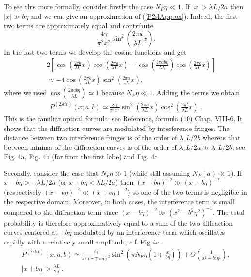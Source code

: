 \documentclass[12pt]{article}   %
\begin{document}
To see this more formally, consider firstly the case
$N_F\eta\ll1$. If $|x|>\lambda L/2a$ then $|x|\gg b\eta$ and we
can give an approximation of (\ref{P2slApprox}). Indeed, the first
two terms are approximately equal and contribute $$
\frac{4\gamma}{\pi^2 x^2} \sin^2 ( \frac{2 \pi a}{\lambda L} x).
$$  In the last two terms we develop the cosine functions and get
\begin{eqnarray*}
&& 2 \left[\cos{(\frac{2\pi b}{\lambda L}x)}\cos{(\frac{2\pi
a}{\lambda L}x)}-\cos{(\frac{2\pi ab\eta}{\lambda
L})}\cos{(\frac{2\pi b}{\lambda L}x)} \right] \\ && \approx -4
\cos (\frac{2 \pi b}{\lambda L} x) \sin^2 (\frac{2 \pi a}{\lambda
L} x),
\end{eqnarray*}
where we used $\cos{(\frac{2\pi ab\eta}{\lambda L})}\simeq1$
because $N_F\eta\ll1$. Adding the terms we obtain
\begin{eqnarray}\label{P2slApprox2}
P^{(2slit)}(x;a,b) \simeq \frac{8\gamma}{\pi^2
x^2}\sin^2{(\frac{2\pi a}{\lambda L}x)} \cos^2{(\frac{2\pi
b}{\lambda L}x)}\ .
\end{eqnarray}
This is the familiar optical formula: see Reference,\cite{Optics} formula
(10) Chap. VIII-6. It shows that the diffraction curves are modulated by
interference fringes. The distance between two interference
fringes is of the order of $\lambda_z L/2b$ whereas that between
minima of the diffraction curves is of the order of $\lambda_z
L/2a \gg \lambda_z L/2b$, see Fig. 4a, Fig. 4b (far from the first
lobe) and Fig. 4c.

Secondly, consider the case that $N_F\eta\gg1$ (while still
assuming $N_F(a)\ll 1$). If $x-b\eta>-\lambda L/2a$ (or
$x+b\eta<\lambda L/2a$) then $(x-b\eta)^{-2}\gg (x+b\eta)^{-2}$
(respectively $(x-b\eta)^{-2}\ll (x+b\eta)^{-2}$) so one of the
two terms is negligible in the respective domain. Moreover, in
both cases, the interference term is small compared to the
diffraction term since $(x-b\eta)^{-2}\gg (x^2-b^2\eta^2)^{-1}$.
The total probability is therefore approximatively equal to a sum
of the two diffraction curves centered at $\pm b\eta$ modulated by
an interference term which oscillates rapidly with a relatively
small amplitude, c.f. Fig 4c :
\begin{multline} \label{P2slApprox3}
P^{(2 slit)}(x;a,b) \simeq  \frac{2\gamma}{\pi^2 (x\mp b\eta)^2}
\sin^2 \left(\pi N_F \eta (1\mp\frac{x}{b\eta}) \right)  +
O(\frac{1}{x^2-b^2\eta^2}), \\ |x\pm b\eta| > \frac{\lambda L}{2a}\
.
\end{multline}
\end{document}
